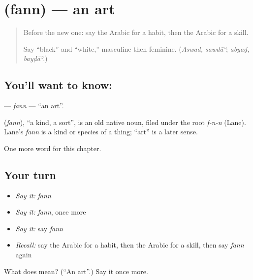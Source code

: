 \section[\texorpdfstring{\ar{فن} (fann)}{فن (fann)}]{ (fann) — an art}

\label{lesson:AR-C109-fann}



\begin{quote}
Before the new one: say the Arabic for a habit, then the Arabic for a skill.

Say \textquotedblleft{}black\textquotedblright{} and \textquotedblleft{}white,\textquotedblright{} masculine then feminine. (\emph{Aswad, sawdāʾ}; \emph{abyaḍ, bayḍāʾ}.)
\end{quote}

\subsection*{You'll want to know: }
\textbf{} — \emph{fann} — \textquotedblleft{}an art\textquotedblright{}.

\begin{cousinweb}
\textbf{} (\emph{fann}), \textquotedblleft{}a kind, a sort\textquotedblright{}, is an old native noun, filed under the root \emph{f-n-n} (Lane). Lane's \emph{fann} is a kind or species of a thing; \textquotedblleft{}art\textquotedblright{} is a later sense.
\end{cousinweb}

\begin{grammarlens}[title={What you've built}]
One more word for this chapter.
\end{grammarlens}

\subsection*{Your turn}
\begin{itemize}
\raggedright
  \item \emph{Say it:} \emph{fann}
  \item \emph{Say it:} \emph{fann}, once more
  \item \emph{Say it:} say \emph{fann}
  \item \emph{Recall:} say the Arabic for a habit, then the Arabic for a skill, then say \emph{fann} again
\end{itemize}

\begin{tcolorbox}[breakable,colback=teal!4,colframe=teal!35!black,title={Before you move on}]
What does  mean? (\textquotedblleft{}An art\textquotedblright{}.) Say it once more.
\end{tcolorbox}
